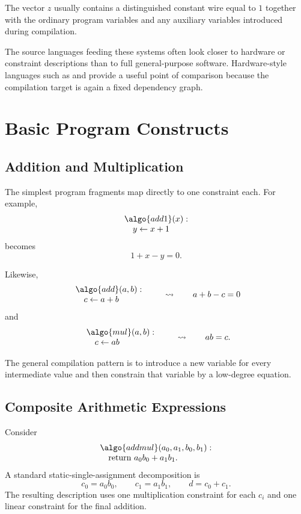 \documentclass[11pt]{article}
\begin{document}
The vector $z$ usually contains a distinguished constant wire equal to $1$
together with the ordinary program variables and any auxiliary variables
introduced during compilation.

The source languages feeding these systems often look closer to hardware or
constraint descriptions than to full general-purpose software.  Hardware-style
languages such as  and  provide a useful point of
comparison because the compilation target is again a fixed dependency graph.

\section{Basic Program Constructs}

\subsection{Addition and Multiplication}

The simplest program fragments map directly to one constraint each.  For
example,
\[
\begin{array}{l}
\algo{add1}(x): \\
\quad y \leftarrow x + 1
\end{array}
\]
becomes
\[
  1 + x - y = 0.
\]

Likewise,
\[
\begin{array}{l}
\algo{add}(a,b): \\
\quad c \leftarrow a+b
\end{array}
\qquad\leadsto\qquad
a+b-c=0
\]
and
\[
\begin{array}{l}
\algo{mul}(a,b): \\
\quad c \leftarrow ab
\end{array}
\qquad\leadsto\qquad
ab=c.
\]

The general compilation pattern is to introduce a new variable for every
intermediate value and then constrain that variable by a low-degree equation.

\subsection{Composite Arithmetic Expressions}

Consider
\[
\begin{array}{l}
\algo{addmul}(a_0,a_1,b_0,b_1): \\
\quad \text{return } a_0b_0 + a_1b_1.
\end{array}
\]
A standard static-single-assignment decomposition is
\[
  c_0 = a_0b_0,\qquad
  c_1 = a_1b_1,\qquad
  d = c_0 + c_1.
\]
The resulting  description uses one multiplication constraint for
each $c_i$ and one linear constraint for the final addition.
\end{document}
